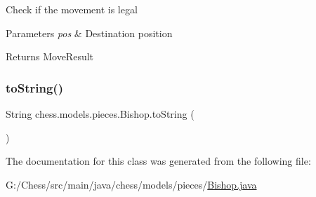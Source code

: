 Check if the movement is legal 
\begin{DoxyParams}{Parameters}
{\em pos} & Destination position \\
\hline
\end{DoxyParams}
\begin{DoxyReturn}{Returns}
Move\+Result 
\end{DoxyReturn}
\mbox{\label{classchess_1_1models_1_1pieces_1_1_bishop_abbdf19ca47acb189eeaa49931eb2f30c}} 
\subsubsection{\texorpdfstring{to\+String()}{toString()}}
{\footnotesize\ttfamily String chess.\+models.\+pieces.\+Bishop.\+to\+String (\begin{DoxyParamCaption}{ }\end{DoxyParamCaption})}



The documentation for this class was generated from the following file\+:\begin{DoxyCompactItemize}
\item 
G\+:/\+Chess/src/main/java/chess/models/pieces/\mbox{\hyperlink{_bishop_8java}{Bishop.\+java}}\end{DoxyCompactItemize}
